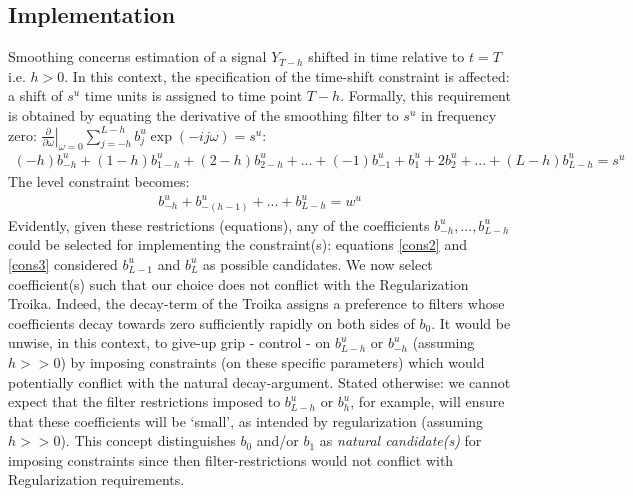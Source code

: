 \documentclass[11pt]{article}
\begin{document}
\subsection{Implementation}\label{implement}

Smoothing concerns estimation of a signal $Y_{T-h}$ shifted in time relative to $t=T$ i.e. $h>0$. In this context, the specification  of the time-shift constraint is affected: a shift of $s^u$ time units is assigned to time point $T-h$. Formally, this requirement is obtained by equating the derivative of the smoothing filter to $s^u$ in frequency zero: $\left.\frac{\partial}{\partial \omega}\right|_{\omega=0}\sum_{j=-h}^{L-h}b_j^u\exp(-ij\omega)=s^u$: 
\begin{eqnarray}\label{cons11s}
(-h)b_{-h}^u+(1-h)b_{1-h}^u+(2-h)b_{2-h}^u+...+(-1)b_{-1}^u+b_{1}^u+2b_{2}^u+...+(L-h)b_{L-h}^u=s^u
\end{eqnarray}
The level constraint becomes:
\begin{eqnarray}\label{cons1s}
b_{-h}^u+b_{-(h-1)}^u+...+b_{L-h}^u=w^u
\end{eqnarray}
Evidently, given these restrictions (equations), any of the coefficients $b_{-h}^u,...,b_{L-h}^u$ could be selected for implementing the constraint(s): equations \ref{cons2} and \ref{cons3} considered $b_{L-1}^u$ and $b_L^u$ as possible candidates. We now select coefficient(s) such that our choice does not conflict with the Regularization Troika. Indeed, the decay-term of the Troika assigns a  preference to filters whose coefficients decay towards zero sufficiently rapidly on both sides of $b_0$. It would be unwise, in this context, to give-up grip - control - on $b_{L-h}^u$ or $b_{-h}^u$ (assuming $h>>0$) by imposing constraints (on these specific parameters) which would potentially conflict with the natural decay-argument. Stated otherwise: we cannot expect that the filter restrictions imposed to $b_{L-h}^u$ or $b_h^u$, for example, will ensure that these coefficients will be `small', as intended by regularization (assuming $h>>0$). This concept distinguishes $b_0$ and/or $b_1$ as \emph{natural candidate(s)} for imposing constraints since then filter-restrictions would not conflict with Regularization requirements. \\
\end{document}

